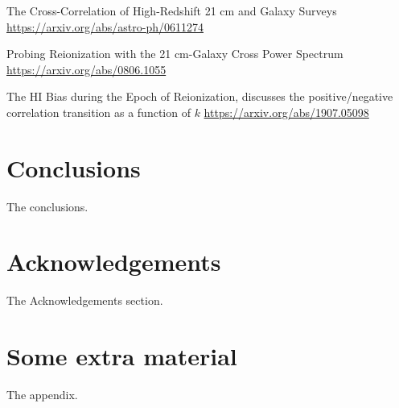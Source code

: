 \documentclass[a4paper,fleqn,usenatbib]{mnras}
\begin{document}
The Cross-Correlation of High-Redshift 21 cm and Galaxy Surveys
\url{https://arxiv.org/abs/astro-ph/0611274}

Probing Reionization with the 21 cm-Galaxy Cross Power Spectrum
\url{https://arxiv.org/abs/0806.1055}

The HI Bias during the Epoch of Reionization, discusses the positive/negative
correlation transition as a function of $k$
\url{https://arxiv.org/abs/1907.05098}

\section{Conclusions} \label{sec:conclusions}

The conclusions.

\section*{Acknowledgements}

The Acknowledgements section.






\appendix

\section{Some extra material}

The appendix.



\bsp	%
\label{lastpage}
\end{document}

